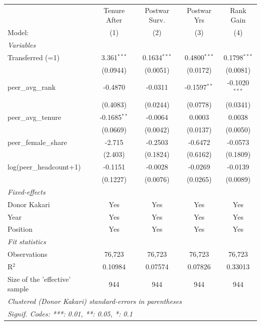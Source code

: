 \begin{table}[htbp]
\begin{threeparttable}
\begin{tabular}{lcccc}
   \tabularnewline \midrule \midrule
                                  & Tenure After   & Postwar Surv.      & Postwar Yrs     & Rank Gain \\   
   Model:                         & (1)            & (2)                & (3)             & (4)\\  
   \midrule
   \emph{Variables}\\
   Transferred (=1)               & 3.361$^{***}$  & 0.1634$^{***}$     & 0.4800$^{***}$  & 0.1798$^{***}$\\   
                                  & (0.0944)       & (0.0051)           & (0.0172)        & (0.0081)\\   
   peer\_avg\_rank                & -0.4870        & -0.0311            & -0.1597$^{**}$  & -0.1020$^{***}$\\   
                                  & (0.4083)       & (0.0244)           & (0.0778)        & (0.0341)\\   
   peer\_avg\_tenure              & -0.1685$^{**}$ & -0.0064            & 0.0003          & 0.0038\\   
                                  & (0.0669)       & (0.0042)           & (0.0137)        & (0.0050)\\   
   peer\_female\_share            & -2.715         & -0.2503            & -0.6472         & -0.0573\\   
                                  & (2.403)        & (0.1824)           & (0.6162)        & (0.1809)\\   
   log(peer\_headcount+1)         & -0.1151        & -0.0028            & -0.0269         & -0.0139\\   
                                  & (0.1227)       & (0.0076)           & (0.0265)        & (0.0089)\\   
   \midrule
   \emph{Fixed-effects}\\
   Donor Kakari                   & Yes            & Yes                & Yes             & Yes\\  
   Year                           & Yes            & Yes                & Yes             & Yes\\  
   Position                       & Yes            & Yes                & Yes             & Yes\\  
   \midrule
   \emph{Fit statistics}\\
   Observations                   & 76,723         & 76,723             & 76,723          & 76,723\\  
   R$^2$                          & 0.10984        & 0.07574            & 0.07826         & 0.33013\\  
   Size of the 'effective' sample & 944            & 944                & 944             & 944\\  
   \midrule \midrule
   \multicolumn{5}{l}{\emph{Clustered (Donor Kakari) standard-errors in parentheses}}\\
   \multicolumn{5}{l}{\emph{Signif. Codes: ***: 0.01, **: 0.05, *: 0.1}}\\
\end{tabular}


\end{threeparttable}
\end{table}
